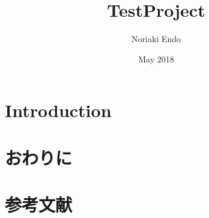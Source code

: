 \documentclass{article}
\title{TestProject}
\author{Noriaki Endo }
\date{May 2018}
\begin{document}
\maketitle

\section{Introduction}
\section{おわりに}
\section{参考文献}
\end{document}
